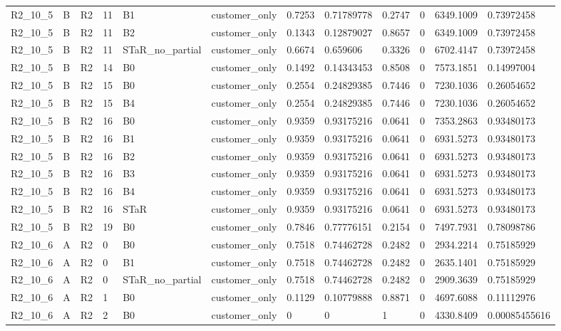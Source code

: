 \begin{longtable}{llllllllllll}
R2\_10\_5 & B & R2 & 11 & B1 & customer\_only & 0.7253 & 0.71789778 & 0.2747 & 0 & 6349.1009 & 0.73972458 \\
R2\_10\_5 & B & R2 & 11 & B2 & customer\_only & 0.1343 & 0.12879027 & 0.8657 & 0 & 6349.1009 & 0.73972458 \\
R2\_10\_5 & B & R2 & 11 & STaR\_no\_partial & customer\_only & 0.6674 & 0.659606 & 0.3326 & 0 & 6702.4147 & 0.73972458 \\
R2\_10\_5 & B & R2 & 14 & B0 & customer\_only & 0.1492 & 0.14343453 & 0.8508 & 0 & 7573.1851 & 0.14997004 \\
R2\_10\_5 & B & R2 & 15 & B0 & customer\_only & 0.2554 & 0.24829385 & 0.7446 & 0 & 7230.1036 & 0.26054652 \\
R2\_10\_5 & B & R2 & 15 & B4 & customer\_only & 0.2554 & 0.24829385 & 0.7446 & 0 & 7230.1036 & 0.26054652 \\
R2\_10\_5 & B & R2 & 16 & B0 & customer\_only & 0.9359 & 0.93175216 & 0.0641 & 0 & 7353.2863 & 0.93480173 \\
R2\_10\_5 & B & R2 & 16 & B1 & customer\_only & 0.9359 & 0.93175216 & 0.0641 & 0 & 6931.5273 & 0.93480173 \\
R2\_10\_5 & B & R2 & 16 & B2 & customer\_only & 0.9359 & 0.93175216 & 0.0641 & 0 & 6931.5273 & 0.93480173 \\
R2\_10\_5 & B & R2 & 16 & B3 & customer\_only & 0.9359 & 0.93175216 & 0.0641 & 0 & 6931.5273 & 0.93480173 \\
R2\_10\_5 & B & R2 & 16 & B4 & customer\_only & 0.9359 & 0.93175216 & 0.0641 & 0 & 6931.5273 & 0.93480173 \\
R2\_10\_5 & B & R2 & 16 & STaR & customer\_only & 0.9359 & 0.93175216 & 0.0641 & 0 & 6931.5273 & 0.93480173 \\
R2\_10\_5 & B & R2 & 19 & B0 & customer\_only & 0.7846 & 0.77776151 & 0.2154 & 0 & 7497.7931 & 0.78098786 \\
R2\_10\_6 & A & R2 & 0 & B0 & customer\_only & 0.7518 & 0.74462728 & 0.2482 & 0 & 2934.2214 & 0.75185929 \\
R2\_10\_6 & A & R2 & 0 & B1 & customer\_only & 0.7518 & 0.74462728 & 0.2482 & 0 & 2635.1401 & 0.75185929 \\
R2\_10\_6 & A & R2 & 0 & STaR\_no\_partial & customer\_only & 0.7518 & 0.74462728 & 0.2482 & 0 & 2909.3639 & 0.75185929 \\
R2\_10\_6 & A & R2 & 1 & B0 & customer\_only & 0.1129 & 0.10779888 & 0.8871 & 0 & 4697.6088 & 0.11112976 \\
R2\_10\_6 & A & R2 & 2 & B0 & customer\_only & 0 & 0 & 1 & 0 & 4330.8409 & 0.00085455616 \\

\end{longtable}
